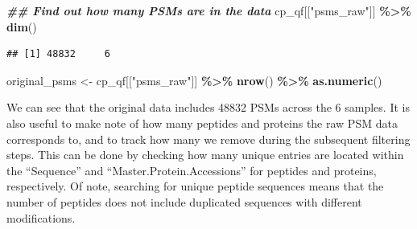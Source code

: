 \documentclass[9pt,a4paper,]{extarticle}
\newenvironment{Shaded}{\begin{snugshade}}{\end{snugshade}}
\newcommand{\DocumentationTok}[1]{\textcolor[rgb]{0.56,0.35,0.01}{\textbf{\textit{#1}}}}
\newcommand{\FunctionTok}[1]{\textcolor[rgb]{0.13,0.29,0.53}{\textbf{#1}}}
\newcommand{\NormalTok}[1]{#1}
\newcommand{\OtherTok}[1]{\textcolor[rgb]{0.56,0.35,0.01}{#1}}
\newcommand{\SpecialCharTok}[1]{\textcolor[rgb]{0.81,0.36,0.00}{\textbf{#1}}}
\newcommand{\StringTok}[1]{\textcolor[rgb]{0.31,0.60,0.02}{#1}}
\begin{document}
\begin{Shaded}
\begin{Highlighting}[]
\DocumentationTok{\#\# Find out how many PSMs are in the data}
\NormalTok{cp\_qf[[}\StringTok{"psms\_raw"}\NormalTok{]] }\SpecialCharTok{\%\textgreater{}\%}
  \FunctionTok{dim}\NormalTok{()}
\end{Highlighting}
\end{Shaded}

\begin{verbatim}
## [1] 48832     6
\end{verbatim}

\begin{Shaded}
\begin{Highlighting}[]
\NormalTok{original\_psms }\OtherTok{\textless{}{-}}\NormalTok{ cp\_qf[[}\StringTok{"psms\_raw"}\NormalTok{]] }\SpecialCharTok{\%\textgreater{}\%}
  \FunctionTok{nrow}\NormalTok{() }\SpecialCharTok{\%\textgreater{}\%}
  \FunctionTok{as.numeric}\NormalTok{()}
\end{Highlighting}
\end{Shaded}

We can see that the original data includes 48832 PSMs
across the 6 samples. It is also useful to make note of how many peptides and
proteins the raw PSM data corresponds to, and to track how many we remove during
the subsequent filtering steps. This can be done by checking how many unique entries
are located within the ``Sequence'' and ``Master.Protein.Accessions'' for peptides
and proteins, respectively. Of note, searching for unique peptide sequences means
that the number of peptides does not include duplicated sequences with different
modifications.
\end{document}
